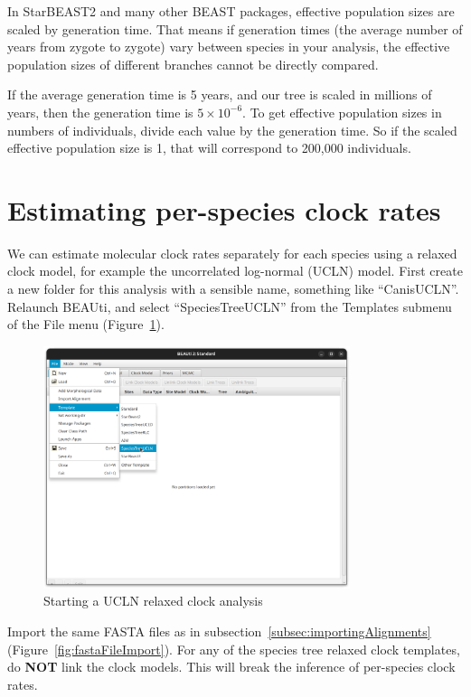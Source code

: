 \documentclass[12pt]{article}
\begin{document}
In StarBEAST2 and many other BEAST packages, effective population sizes are
scaled by generation time. That means if generation times (the average
number of years from zygote to zygote) vary between species in your
analysis, the effective population sizes of different branches cannot be
directly compared.

If the average generation time is 5 years, and our tree is scaled in millions
of years, then the generation time is $5\times10^{-6}$. To get effective
population sizes in numbers of individuals, divide each value by the
generation time. So if the scaled effective population size is 1, that
will correspond to 200,000 individuals.{}

\section{Estimating per-species clock rates}
\label{sec:relaxedClock}

We can estimate molecular clock rates separately for each species using
a relaxed clock model, for example the uncorrelated log-normal (UCLN) model.
First create a new folder for this analysis with a sensible name, something
like ``CanisUCLN''. Relaunch BEAUti, and select ``SpeciesTreeUCLN'' from the
Templates submenu of the File menu (Figure~\ref{fig:speciesTreeUCLN}).

\begin{figure}[htb!]
\centering
\includegraphics[width=0.8\textwidth]{figures/speciesTreeUCLN.png}
\caption
{Starting a UCLN relaxed clock analysis}
\label{fig:speciesTreeUCLN}
\end{figure}

Import the same FASTA files as in
subsection~\ref{subsec:importingAlignments}
(Figure~\ref{fig:fastaFileImport}). For any of the species tree relaxed clock
templates, do \textbf{NOT} link the clock models. This will break the inference
of per-species clock rates.
\end{document}

